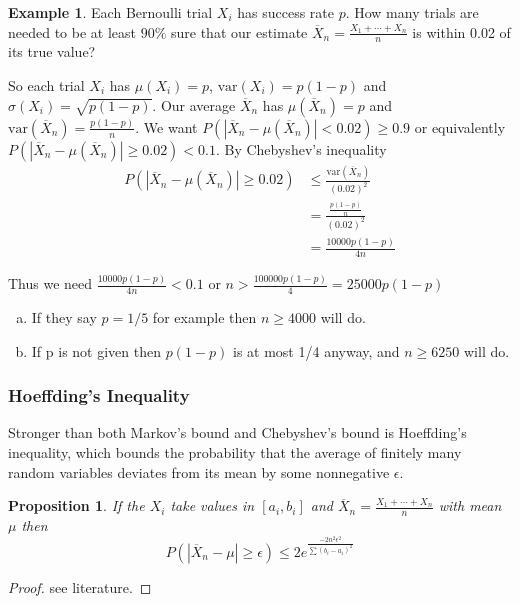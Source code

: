 \documentclass[12pt]{amsart}
\newtheorem{proposition}[theorem]{Proposition}
\theoremstyle{definition}
\newtheorem{example}[theorem]{Example}
\begin{document}
\begin{example} \label{Chebyshev_find_n} Each Bernoulli trial $X_i$ has success rate $p$. How many trials are needed to be at least $90\%$ sure that our estimate $\overline{X}_n = \frac{X_1 + \cdots + X_n}{n}$ is within 0.02 of its true value?

So each trial $X_i$ has $\mu(X_i) = p$, $\text{var}(X_i) = p(1 - p)$ and $\sigma(X_i) = \sqrt{p(1 - p)}$. Our average $\overline{X}_n$ has $\mu(\overline{X}_n)=p$ and $\text{var}(\overline{X}_n) = \frac{p(1 - p)}{n}$. We want $P(|\overline{X}_n-\mu(\overline{X}_n)|<0.02)\geq 0.9$
or equivalently $P(|\overline{X}_n-\mu(\overline{X}_n)|\geq 0.02)<0.1$. By Chebyshev's inequality
\begin{align*}
P(|\overline{X}_n - \mu(\overline{X}_n) |\geq 0.02) & \leq \frac{\text{var}(\overline{X}_n)}{(0.02)^2} \\
 & = \frac{\frac{p(1 - p)}{n}}{(0.02)^2} \\
 & = \frac{10000p(1 - p)}{4n}
\end{align*}

Thus we need $\frac{10000p(1 - p)}{4n} < 0.1$ or $n >
\frac{100000p(1 - p)}{4}= 25000p(1 - p)$
\begin{enumerate}[a.]
\item If they say $p=1/5$ for example then $n \geq 4000$ will do.
\item If p is not given then $p(1 - p)$ is at most 1/4 anyway, and $n \geq 6250$ will do.
\end{enumerate}
\end{example}

\subsubsection{Hoeffding's Inequality} Stronger than both Markov's bound and Chebyshev's bound is Hoeffding's inequality, which bounds the probability that the average of finitely many random variables deviates from its mean by some nonnegative $\epsilon$.

\begin{proposition} If the $X_i$ take values in $[a_i, b_i]$ and $\overline{X}_n = \frac{X_1 + \cdots + X_n}{n}$ with mean $\mu$ then
$$P(|\overline{X}_n - \mu| \geq \epsilon) \leq 2e^{\frac{-2n^2 \epsilon^2}{\sum (b_i - a_i)^2}}$$
\end{proposition}
\begin{proof} see literature.
\end{proof}
\end{document}
